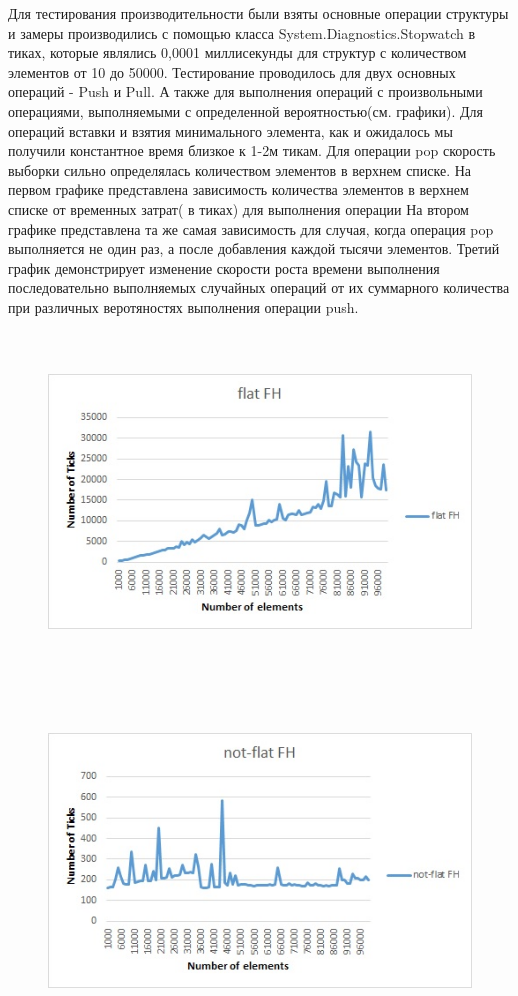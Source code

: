 \documentclass[article, a4paper]{llncs}
\begin{document}
    Для тестирования производительности были взяты основные операции структуры и замеры производились с помощью класса System.Diagnostics.Stopwatch в тиках, которые являлись 0,0001 миллисекунды для структур с количеством элементов от 10 до 50000. 
    Тестирование проводилось для двух основных операций - Push и Pull. А также для выполнения операций с произвольными операциями, выполняемыми с определенной вероятностью(см. графики). Для операций вставки и взятия минимального элемента, как и ожидалось мы получили константное время близкое к 1-2м тикам. Для операции pop скорость выборки сильно определялась количеством элементов в верхнем списке. На первом графике представлена зависимость количества элементов в верхнем списке от временных затрат( в тиках) для выполнения операции На втором графике представлена та же самая зависимость для случая, когда операция pop выполняется не один раз, а после добавления каждой тысячи элементов. Третий график демонстрирует изменение скорости роста времени выполнения последовательно выполняемых случайных операций от их суммарного количества при различных веротяностях выполнения операции push. 
    \begin{figure}[h]
        \includegraphics[width=15cm, height=9cm]{Flat FH pop.jpg}
        \centering
    \end{figure}
    \begin{figure}[h]
        \includegraphics[width=15cm, height=9cm]{non-Flat FH pop.jpg}
        \centering
    \end{figure}
\end{document}
